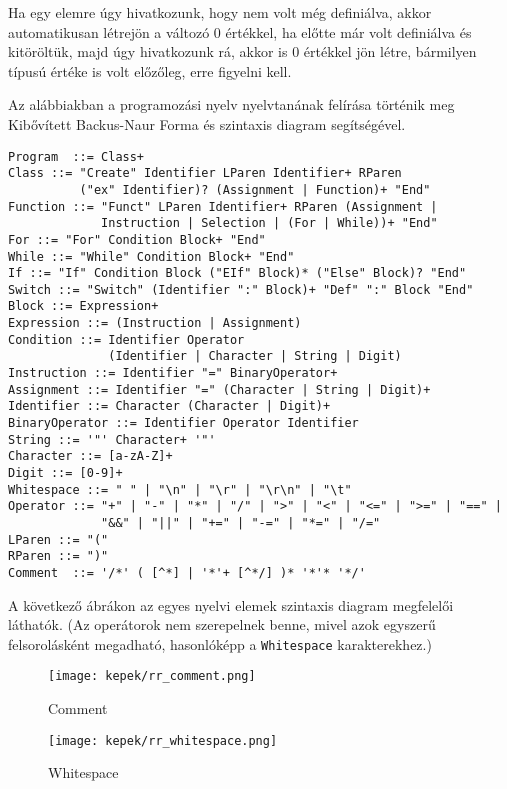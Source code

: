 Ha egy elemre úgy hivatkozunk, hogy nem volt még definiálva, akkor automatikusan létrejön a változó 0 értékkel, ha előtte már volt definiálva és kitöröltük, majd úgy hivatkozunk rá, akkor is 0 értékkel jön létre, bármilyen típusú értéke is volt előzőleg, erre figyelni kell.



Az alábbiakban a programozási nyelv nyelvtanának felírása történik meg Kibővített Backus-Naur Forma és szintaxis diagram segítségével.

\begin{verbatim}
Program  ::= Class+
Class ::= "Create" Identifier LParen Identifier+ RParen
          ("ex" Identifier)? (Assignment | Function)+ "End"
Function ::= "Funct" LParen Identifier+ RParen (Assignment |
             Instruction | Selection | (For | While))+ "End"
For ::= "For" Condition Block+ "End"
While ::= "While" Condition Block+ "End"
If ::= "If" Condition Block ("EIf" Block)* ("Else" Block)? "End"
Switch ::= "Switch" (Identifier ":" Block)+ "Def" ":" Block "End"
Block ::= Expression+
Expression ::= (Instruction | Assignment)
Condition ::= Identifier Operator
              (Identifier | Character | String | Digit)
Instruction ::= Identifier "=" BinaryOperator+
Assignment ::= Identifier "=" (Character | String | Digit)+
Identifier ::= Character (Character | Digit)+
BinaryOperator ::= Identifier Operator Identifier
String ::= '"' Character+ '"'
Character ::= [a-zA-Z]+
Digit ::= [0-9]+
Whitespace ::= " " | "\n" | "\r" | "\r\n" | "\t"
Operator ::= "+" | "-" | "*" | "/" | ">" | "<" | "<=" | ">=" | "==" |
             "&&" | "||" | "+=" | "-=" | "*=" | "/="
LParen ::= "("
RParen ::= ")"
Comment  ::= '/*' ( [^*] | '*'+ [^*/] )* '*'* '*/'
\end{verbatim}


A következő ábrákon az egyes nyelvi elemek szintaxis diagram megfelelői láthatók. (Az operátorok nem szerepelnek benne, mivel azok egyszerű felsorolásként megadható, hasonlóképp a \texttt{Whitespace} karakterekhez.)

\begin{figure}[h!]
\centering
\texttt{[image: kepek/rr\_comment.png]}
\caption{Comment}
\label{fig:rr_comment}
\end{figure}

\begin{figure}[h!]
\centering
\texttt{[image: kepek/rr\_whitespace.png]}
\caption{Whitespace}
\label{fig:rr_whitespace}
\end{figure}

